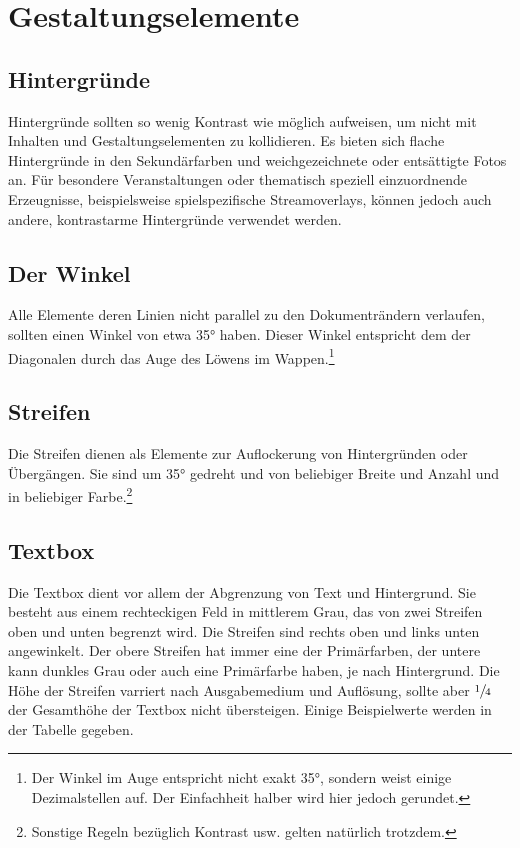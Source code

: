 \documentclass{article}
\begin{document}
\section{Gestaltungselemente}

\subsection{Hintergründe}
Hintergründe sollten so wenig Kontrast wie möglich aufweisen, um nicht mit Inhalten und Gestaltungselementen zu kollidieren. Es bieten sich flache Hintergründe in den Sekundärfarben und weichgezeichnete oder entsättigte Fotos an. Für besondere Veranstaltungen oder thematisch speziell einzuordnende Erzeugnisse, beispielsweise spielspezifische Streamoverlays, können jedoch auch andere, kontrastarme Hintergründe verwendet werden.


\subsection{Der Winkel}
Alle Elemente deren Linien nicht parallel zu den Dokumenträndern verlaufen, sollten einen Winkel von etwa 35° haben. Dieser Winkel entspricht dem der Diagonalen durch das Auge des Löwens im Wappen.\footnote{Der Winkel im Auge entspricht nicht exakt 35°, sondern weist einige Dezimalstellen auf. Der Einfachheit halber wird hier jedoch gerundet.}


\subsection{Streifen}
Die Streifen dienen als Elemente zur Auflockerung von Hintergründen oder Übergängen. Sie sind um 35° gedreht und von beliebiger Breite und Anzahl und in beliebiger Farbe.\footnote{Sonstige Regeln bezüglich Kontrast usw. gelten natürlich trotzdem.}


\subsection{Textbox}
Die Textbox dient vor allem der Abgrenzung von Text und Hintergrund. Sie besteht aus einem rechteckigen Feld in mittlerem Grau, das von zwei Streifen oben und unten begrenzt wird. Die Streifen sind rechts oben und links unten angewinkelt. Der obere Streifen hat immer eine der Primärfarben, der untere kann dunkles Grau oder auch eine Primärfarbe haben, je nach Hintergrund. Die Höhe der Streifen varriert nach Ausgabemedium und Auflösung, sollte aber $\sfrac{1}{4}$ der Gesamthöhe der Textbox nicht übersteigen. Einige Beispielwerte werden in der Tabelle gegeben.
\end{document}
